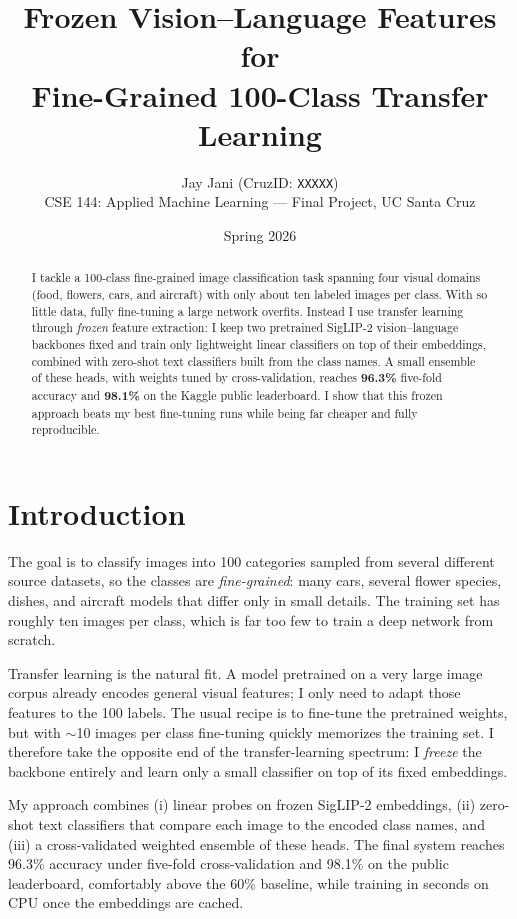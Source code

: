 \documentclass[11pt]{article}
\title{\vspace{-1.5em}\textbf{Frozen Vision--Language Features for\\ Fine-Grained 100-Class Transfer Learning}\vspace{-0.3em}}
\author{
  Jay Jani (CruzID: \texttt{XXXXX})\\
  \small CSE 144: Applied Machine Learning --- Final Project, UC Santa Cruz
}
\date{Spring 2026}
\begin{document}
\maketitle

\begin{abstract}
\noindent
I tackle a 100-class fine-grained image classification task spanning four visual
domains (food, flowers, cars, and aircraft) with only about ten labeled images per
class. With so little data, fully fine-tuning a large network overfits. Instead I
use transfer learning through \emph{frozen} feature extraction: I keep two
pretrained SigLIP-2 vision--language backbones fixed and train only lightweight
linear classifiers on top of their embeddings, combined with zero-shot text
classifiers built from the class names. A small ensemble of these heads, with
weights tuned by cross-validation, reaches \textbf{96.3\%} five-fold accuracy and
\textbf{98.1\%} on the Kaggle public leaderboard. I show that this frozen approach
beats my best fine-tuning runs while being far cheaper and fully reproducible.
\end{abstract}

\section{Introduction}

The goal is to classify images into 100 categories sampled from several different
source datasets, so the classes are \emph{fine-grained}: many cars, several flower
species, dishes, and aircraft models that differ only in small details. The
training set has roughly ten images per class, which is far too few to train a deep
network from scratch.

Transfer learning is the natural fit. A model pretrained on a very large image
corpus already encodes general visual features; I only need to adapt those
features to the 100 labels. The usual recipe is to fine-tune the pretrained
weights, but with $\sim$10 images per class fine-tuning quickly memorizes the
training set. I therefore take the opposite end of the transfer-learning
spectrum: I \emph{freeze} the backbone entirely and learn only a small classifier
on top of its fixed embeddings.

My approach combines (i) linear probes on frozen SigLIP-2 embeddings, (ii)
zero-shot text classifiers that compare each image to the encoded class names, and
(iii) a cross-validated weighted ensemble of these heads. The final system reaches
96.3\% accuracy under five-fold cross-validation and 98.1\% on the public
leaderboard, comfortably above the 60\% baseline, while training in seconds on CPU
once the embeddings are cached.
\end{document}
